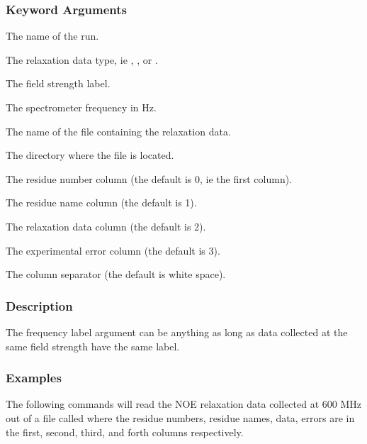 \subsubsection{Keyword Arguments}

  The name of the run. 

  The relaxation data type, ie , , or . 

  The field strength label. 

  The spectrometer frequency in Hz. 

  The name of the file containing the relaxation data. 

  The directory where the file is located. 

  The residue number column (the default is 0, ie the first column). 

  The residue name column (the default is 1). 

  The relaxation data column (the default is 2). 

  The experimental error column (the default is 3). 

  The column separator (the default is white space). 




\subsubsection{Description}

The frequency label argument can be anything as long as data collected at the same field strength have the same label.



\subsubsection{Examples}

The following commands will read the NOE relaxation data collected at 600 MHz out of a file called  where the residue numbers, residue names, data, errors are in the first, second, third, and forth columns respectively.



